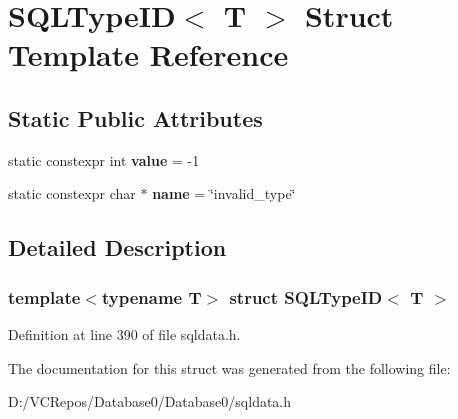 \hypertarget{struct_s_q_l_type_i_d}{}\section{S\+Q\+L\+Type\+ID$<$ T $>$ Struct Template Reference}
\label{struct_s_q_l_type_i_d}
\subsection*{Static Public Attributes}
\begin{DoxyCompactItemize}
\item 
\mbox{\label{struct_s_q_l_type_i_d_a2e570aa94185b72ebe89ddea9544f4f8}} 
static constexpr int {\bfseries value} = -\/1
\item 
\mbox{\label{struct_s_q_l_type_i_d_ae377b56b5a97835b8121cc6f4fd52be7}} 
static constexpr char $\ast$ {\bfseries name} = \char`\"{}invalid\+\_\+type\char`\"{}
\end{DoxyCompactItemize}


\subsection{Detailed Description}
\subsubsection*{template$<$typename T$>$\newline
struct S\+Q\+L\+Type\+I\+D$<$ T $>$}



Definition at line 390 of file sqldata.\+h.



The documentation for this struct was generated from the following file\+:\begin{DoxyCompactItemize}
\item 
D\+:/\+V\+C\+Repos/\+Database0/\+Database0/sqldata.\+h\end{DoxyCompactItemize}
